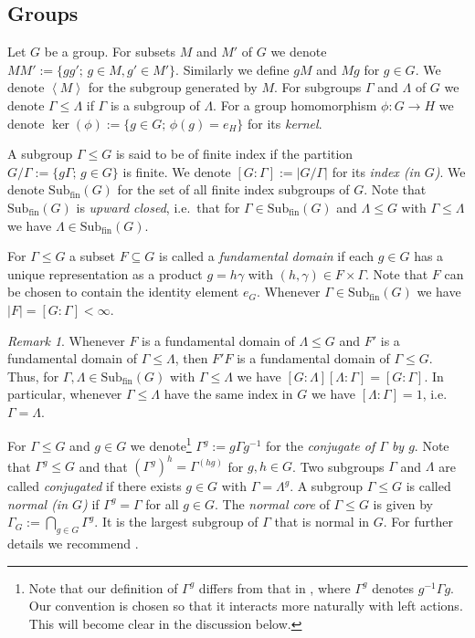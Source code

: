 \documentclass[12pt, reqno]{amsart}
\theoremstyle{definition}
\theoremstyle{remark}
\newtheorem{remark}[theorem]{Remark}
\numberwithin{equation}{section}
\theoremstyle{theorem}
\theoremstyle{remark}
\newcommand{\grouphull}[1]{\left\langle #1 \right\rangle}
\def\subfin{{\operatorname{Sub_{fin}}}}
\begin{document}
\subsection{Groups}
\label{subsec:prelims_groups}
Let $G$ be a group. 
For subsets $M$ and $M'$ of $G$ we denote 
$MM':=\{gg';\, g\in M,g'\in M'\}$. 
Similarly we define $gM$ and $Mg$ for $g\in G$. 
We denote $\grouphull{M}$ for the subgroup generated by $M$.
For subgroups $\Gamma$ and $\Lambda$ of $G$ we denote $\Gamma\leq \Lambda$ if $\Gamma$ is a subgroup of $\Lambda$. 
For a group homomorphism $\phi\colon G\to H$ we denote $\ker(\phi):=\{g\in G;\, \phi(g)=e_H\}$ for its \emph{kernel}.

A subgroup $\Gamma\leq G$ is said to be of finite index if the partition
$G/\Gamma:=\{g\Gamma;\, g\in G\}$ is finite.
We denote $[G\colon \Gamma]:=|G/\Gamma|$ for its \emph{index (in $G$)}. 
We denote $\subfin(G)$ for the set of all finite index subgroups of $G$.
Note that $\subfin(G)$ is \emph{upward closed}, i.e.\ that for $\Gamma\in \subfin(G)$ and $\Lambda\leq G$ with $\Gamma\leq \Lambda$ we have $\Lambda\in \subfin(G)$. 

For $\Gamma\leq G$ a subset $F\subseteq G$ is called a \emph{fundamental domain} if each $g\in G$ has a unique representation as a product $g=h\gamma$ with $(h,\gamma)\in F\times \Gamma$. Note that $F$ can be chosen to contain the identity element $e_G$. 
Whenever $\Gamma\in \subfin(G)$ we have $|F|=[G\colon \Gamma]<\infty$. 

\begin{remark}
\label{rem:fundamentalDomainsComposition}
    Whenever $F$ is a fundamental domain of $\Lambda\leq G$ and $F'$ is a fundamental domain of $\Gamma\leq \Lambda$, then $F'F$ is a fundamental domain of $\Gamma\leq G$. 
    Thus, for $\Gamma,\Lambda\in \subfin(G)$ with $\Gamma\leq \Lambda$ we have $[G\colon \Lambda][\Lambda \colon \Gamma]=[G\colon \Gamma]$. 
    In particular, whenever $\Gamma\leq \Lambda$ have the same index in $G$ we have $[\Lambda\colon \Gamma]=1$, i.e.\ $\Gamma=\Lambda$. 
\end{remark}

For $\Gamma\leq G$ and $g\in G$ we denote\footnote{
Note that our definition of $\Gamma^g$ differs from that in \cite{ribes2000profinite}, where $\Gamma^g$ denotes $g^{-1}\Gamma g$. Our convention is chosen so that it interacts more naturally with left actions. This will become clear in the discussion below.
} 
$\Gamma^g:=g\Gamma g^{-1}$ for the \emph{conjugate of $\Gamma$ by $g$}.
Note that $\Gamma^g\leq G$ and that $(\Gamma^g)^h=\Gamma^{(hg)}$ for $g,h\in G$. 
Two subgroups $\Gamma$ and $\Lambda$ are called \emph{conjugated} if there exists $g\in G$ with $\Gamma=\Lambda^g$. 
A subgroup $\Gamma\leq G$ is called \emph{normal (in $G$)} if $\Gamma^g=\Gamma$ for all $g\in G$. 
The \emph{normal core} of $\Gamma\leq G$ is given by $\Gamma_G:=\bigcap_{g\in G} \Gamma^g$. 
It is the largest subgroup of $\Gamma$ that is normal in $G$.
For further details we recommend \cite{ribes2000profinite}. 
\end{document}
